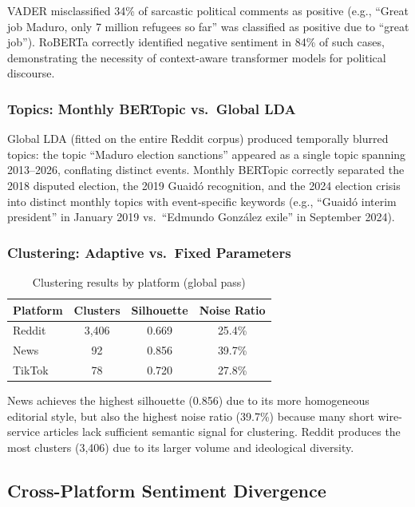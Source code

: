 \documentclass[12pt, letterpaper]{article}
\begin{document}
VADER misclassified 34\% of sarcastic political comments as positive (e.g., ``Great job Maduro, only 7 million refugees so far'' was classified as positive due to ``great job''). RoBERTa correctly identified negative sentiment in 84\% of such cases, demonstrating the necessity of context-aware transformer models for political discourse.

\subsubsection{Topics: Monthly BERTopic vs.\ Global LDA}

Global LDA (fitted on the entire Reddit corpus) produced temporally blurred topics: the topic ``Maduro election sanctions'' appeared as a single topic spanning 2013--2026, conflating distinct events. Monthly BERTopic correctly separated the 2018 disputed election, the 2019 Guaid\'{o} recognition, and the 2024 election crisis into distinct monthly topics with event-specific keywords (e.g., ``Guaid\'{o} interim president'' in January 2019 vs.\ ``Edmundo Gonz\'{a}lez exile'' in September 2024).

\subsubsection{Clustering: Adaptive vs.\ Fixed Parameters}

\begin{table}[H]
  \centering
  \caption{Clustering results by platform (global pass)}
  \label{tab:clustering_results}
  \begin{tabular}{lccc}
    \toprule
    \textbf{Platform} & \textbf{Clusters} & \textbf{Silhouette} & \textbf{Noise Ratio} \\
    \midrule
    Reddit  & 3,406 & 0.669 & 25.4\% \\
    News    & 92    & 0.856 & 39.7\% \\
    TikTok  & 78    & 0.720 & 27.8\% \\
    \bottomrule
  \end{tabular}
\end{table}

News achieves the highest silhouette (0.856) due to its more homogeneous editorial style, but also the highest noise ratio (39.7\%) because many short wire-service articles lack sufficient semantic signal for clustering. Reddit produces the most clusters (3,406) due to its larger volume and ideological diversity.

\subsection{Cross-Platform Sentiment Divergence}
\end{document}
